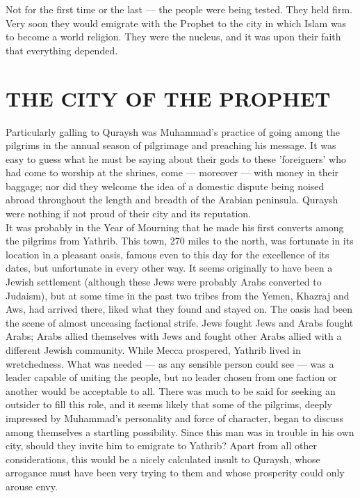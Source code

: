 \documentclass[10pt, twoside,openright]{book}
\begin{document}
Not for the first time or the last --- the people were being tested. They held firm. Very soon they 
would emigrate with the Prophet to the city in which Islam was to become a world religion. They were 
the nucleus, and it was upon their faith that everything depended. \\

\chapter{THE CITY OF THE PROPHET}

Particularly galling to Quraysh was Muhammad's practice of going among the pilgrims in the annual 
season of pilgrimage and preaching his message. It was easy to guess what he must be saying about 
their gods to these 'foreigners' who had come to worship at the shrines, come --- moreover --- with money in their baggage; nor did they welcome the idea of a domestic dispute being noised abroad throughout the length and breadth of the Arabian peninsula. Quraysh were nothing if not proud of their city and its reputation. \\

It was probably in the Year of Mourning that he made his first converts among the pilgrims from 
Yathrib. This town, 270 miles to the north, was fortunate in its location in a pleasant oasis, famous 
even to this day for the excellence of its dates, but unfortunate in every other way. It seems 
originally to have been a Jewish settlement (although these Jews were probably Arabs converted to 
Judaism), but at some time in the past two tribes from the Yemen, Khazraj and Aws, had arrived there, 
liked what they found and stayed on. The oasis had been the scene of almost unceasing factional 
strife. Jews fought Jews and Arabs fought Arabs; Arabs allied themselves with Jews and fought other 
Arabs allied with a different Jewish community. While Mecca prospered, Yathrib lived in wretchedness. 
What was needed --- as any sensible person could see --- was a leader capable of uniting the people, but 
no leader chosen from one faction or another would be acceptable to all. There was much to be said 
for seeking an outsider to fill this role, and it seems likely that some of the pilgrims, deeply 
impressed by Muhammad's personality and force of character, began to discuss among themselves a 
startling possibility. Since this man was in trouble in his own city, should they invite him to 
emigrate to Yathrib? Apart from all other considerations, this would be a nicely calculated insult to 
Quraysh, whose arrogance must have been very trying to them and whose prosperity could only arouse 
envy. \\
\end{document}
